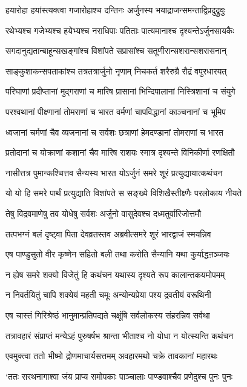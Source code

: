 \twolineshloka
{हयारोहा हयांस्त्यक्त्वा गजारोहाश्च दन्तिनः}
{अर्जुनस्य भयाद्राजन्समन्ताद्विप्रदुद्रुवुः}


\twolineshloka
{रथेभ्यश्च गजेभ्यश्च हयेभ्यश्च नराधिपाः}
{पतिताः पात्यमानाश्च दृश्यन्तेऽर्जुनसायकैः}


\twolineshloka
{सगदानुद्यतान्बाहून्सखङ्गांश्च विशांपते}
{सप्रासांश्च सतूणीरान्सशरान्सशरासनान्}


\twolineshloka
{साङ्कुशाकन्सपताकांश्च तत्रतत्रार्जुनो नृणाम्}
{निचकर्त शरैरुग्रै रौद्रं वपुरधारयत्}


\twolineshloka
{परिघाणां प्रदीप्तानां मुद्गराणां च मारिष}
{प्रासानां भिन्दिपालानां निस्त्रिशानां च संयुगे}


\twolineshloka
{परश्वथानां पीक्ष्णानां तोमराणां च भारत}
{वर्मणां चापविद्धानां काञ्चनानां च भूमिप}


\twolineshloka
{ध्वजानां चर्मणां चैव व्यजनानां च सर्वशः}
{छत्राणां हेमदण्डानां तोमराणां च भारत}


\twolineshloka
{प्रतोदानां च योक्राणां कशानां चैव मारिष}
{राशयः स्मात्र दृश्यन्ते विनिकीर्णा रणक्षितौ}


\twolineshloka
{नासीत्तत्र पुमान्कश्चित्तव सैन्यस्य भारत}
{योऽर्जुनं समरे शूरं प्रत्युद्यायात्कथंचन}


\twolineshloka
{यो यो हि समरे पार्थं प्रत्युद्याति विशांपते}
{स सङ्ख्ये विशिखैस्तीक्ष्णैः परलोकाय नीयते}


\twolineshloka
{तेषु विद्रवमाणेषु तव योधेषु सर्वशः}
{अर्जुनो वासुदेवश्च दध्मतुर्वारिजोत्तमौ}


\twolineshloka
{तत्पभग्नं बलं दृष्ट्वा पिता देवव्रतस्तव}
{अब्रवीत्समरे शूरं भारद्वाजं स्मयन्निव}


\twolineshloka
{एष पाण्डुसुतो वीर कृष्णेन सहितो बली}
{तथा करोति सैन्यानि यथा कुर्याद्धऩञ्जयः}


\twolineshloka
{न ह्येष समरे शक्यो विजेतुं हि कथंचन}
{यथास्य दृश्यते रूप कालान्तकयमोपमम्}


\twolineshloka
{न निवर्तयितुं चापि शक्येयं महती चमूः}
{अन्योन्यप्रेया पश्य द्रवतीयं वरूथिनी}


\twolineshloka
{एष चास्तं गिरिश्रेष्ठं भानुमान्प्रतिपद्यते}
{चक्षूंषि सर्वलोकस्य संहरन्निव सर्वथा}


\twolineshloka
{तत्रावहारं संप्राप्तं मन्येऽहं पुरुषर्षभ}
{श्रान्ता भीताश्च नो योधा न योत्स्यन्ति कथंचन}


\twolineshloka
{एवमुक्त्वा ततो भीष्मो द्रोणमाचार्यसत्तमम्}
{अवहारमथो चक्रे तावकानां महारथः}


\twolineshloka
{`ततः सरथनागाश्वा जंय प्राप्य समोपकाः}
{पाञ्चालाः पाण्डवाश्चैव प्रणेदुश्च पुनः पुनः}


